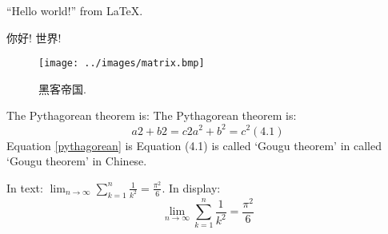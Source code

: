 \documentclass{ctexart}
\begin{document}
``Hello world!'' from \LaTeX.

你好! 世界!

\begin{figure}
  \texttt{[image: ../images/matrix.bmp]}
  \caption{黑客帝国.}
\end{figure}

The Pythagorean theorem is:
The Pythagorean theorem is:
\begin{equation}
a 2 + b 2 = c 2
a^2 + b^2 = c^2 \label{pythagorean}
(4.1)
\end{equation}
Equation \eqref{pythagorean} is Equation (4.1) is called ‘Gougu theorem’ in
called `Gougu theorem' in Chinese.


In text:
$\lim_{n \to \infty}
\sum_{k=1}^n \frac{1}{k^2}
= \frac{\pi^2}{6}$.
In display:
\[
\lim_{n \to \infty}
\sum_{k=1}^n \frac{1}{k^2}
= \frac{\pi^2}{6}
\]
\end{document}
